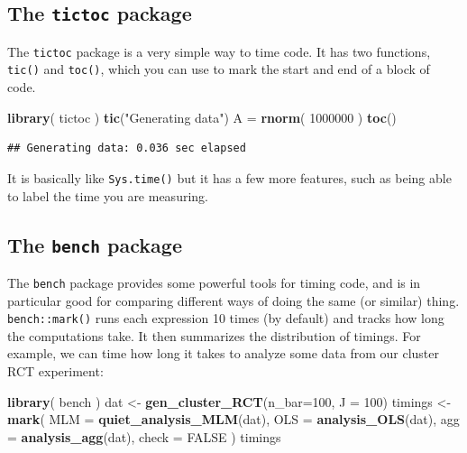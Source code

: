 \documentclass[
]{book}
\newenvironment{Shaded}{\begin{snugshade}}{\end{snugshade}}
\newcommand{\AttributeTok}[1]{\textcolor[rgb]{0.13,0.29,0.53}{#1}}
\newcommand{\ConstantTok}[1]{\textcolor[rgb]{0.56,0.35,0.01}{#1}}
\newcommand{\DecValTok}[1]{\textcolor[rgb]{0.00,0.00,0.81}{#1}}
\newcommand{\FunctionTok}[1]{\textcolor[rgb]{0.13,0.29,0.53}{\textbf{#1}}}
\newcommand{\NormalTok}[1]{#1}
\newcommand{\OtherTok}[1]{\textcolor[rgb]{0.56,0.35,0.01}{#1}}
\newcommand{\StringTok}[1]{\textcolor[rgb]{0.31,0.60,0.02}{#1}}
\begin{document}
\subsection{\texorpdfstring{The \texttt{tictoc} package}{The tictoc package}}\label{the-tictoc-package}

The \texttt{tictoc} package is a very simple way to time code.
It has two functions, \texttt{tic()} and \texttt{toc()}, which you can use to mark the start and end of a block of code.

\begin{Shaded}
\begin{Highlighting}[]
\FunctionTok{library}\NormalTok{( tictoc )}
\FunctionTok{tic}\NormalTok{(}\StringTok{"Generating data"}\NormalTok{)}
\NormalTok{A }\OtherTok{=} \FunctionTok{rnorm}\NormalTok{( }\DecValTok{1000000}\NormalTok{ )}
\FunctionTok{toc}\NormalTok{()}
\end{Highlighting}
\end{Shaded}

\begin{verbatim}
## Generating data: 0.036 sec elapsed
\end{verbatim}

It is basically like \texttt{Sys.time()} but it has a few more features, such as being able to label the time you are measuring.

\subsection{\texorpdfstring{The \texttt{bench} package}{The bench package}}\label{the-bench-package}

The \texttt{bench} package provides some powerful tools for timing code, and is in particular good for comparing different ways of doing the same (or similar) thing.
\texttt{bench::mark()} runs each expression 10 times (by default) and tracks how long the computations take. It then summarizes the distribution of timings.
For example, we can time how long it takes to analyze some data from our cluster RCT experiment:

\begin{Shaded}
\begin{Highlighting}[]
\FunctionTok{library}\NormalTok{( bench )}
\NormalTok{dat }\OtherTok{\textless{}{-}} \FunctionTok{gen\_cluster\_RCT}\NormalTok{(}\AttributeTok{n\_bar=}\DecValTok{100}\NormalTok{, }\AttributeTok{J =} \DecValTok{100}\NormalTok{)}
\NormalTok{timings }\OtherTok{\textless{}{-}} \FunctionTok{mark}\NormalTok{(}
      \AttributeTok{MLM =} \FunctionTok{quiet\_analysis\_MLM}\NormalTok{(dat),}
      \AttributeTok{OLS =} \FunctionTok{analysis\_OLS}\NormalTok{(dat),}
      \AttributeTok{agg =} \FunctionTok{analysis\_agg}\NormalTok{(dat),}
      \AttributeTok{check =} \ConstantTok{FALSE}
\NormalTok{)}
\NormalTok{timings}
\end{Highlighting}
\end{Shaded}
\end{document}

